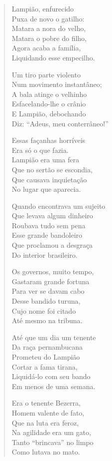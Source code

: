 \begin{verse}
Lampião, enfurecido\\
Puxa de novo o gatilho:\\
Matara a nora do velho,\\
Matara o pobre do filho,\\
Agora acaba a família,\\
Liquidando esse empecilho.

Um tiro parte violento\\
Num movimento instantâneo;\\
A bala atinge o velhinho\\
Esfacelando-lhe o crânio\\
E Lampião, debochando\\
Diz: “Adeus, meu conterrâneo!”

Essas façanhas horríveis\\
Era só o que fazia.\\
Lampião era uma fera\\
Que no sertão se escondia,\\
Que causava inquietação\\
No lugar que aparecia.
\pagebreak

Quando encontrava um sujeito\\
Que levava algum dinheiro\\
Roubava tudo sem pena\\
Esse grande bandoleiro\\
Que proclamou a desgraça\\
Do interior brasileiro.

Os governos, muito tempo,\\
Gastaram grande fortuna\\
Para ver se davam cabo\\
Desse bandido turuna,\\
Cujo nome foi citado\\
Até mesmo na tribuna.

Até que um dia um tenente\\
Da raça pernambucana\\
Prometeu do Lampião\\
Cortar a fama tirana,\\
Liquidá-lo com seu bando\\
Em menos de uma semana.

Era o tenente Bezerra,\\
Homem valente de fato,\\
Que na luta era feroz,\\
Na agilidade era um gato,\\
Tanto “brincava” no limpo\\
Como lutava no mato.
\pagebreak


\end{verse}
